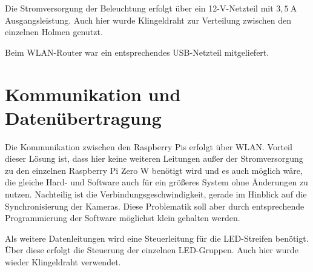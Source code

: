 \documentclass[./00PhotoBox.tex]{subfiles}
\begin{document}
Die Stromversorgung der Beleuchtung erfolgt über ein 12-V-Netzteil mit $3,5~\text{A}$ Ausgangsleistung. Auch hier wurde Klingeldraht zur Verteilung zwischen den einzelnen Holmen genutzt.

Beim WLAN-Router war ein entsprechendes USB-Netzteil mitgeliefert.

\section{Kommunikation und Datenübertragung}
Die Kommunikation zwischen den Raspberry Pis erfolgt über WLAN. Vorteil dieser Lösung ist, dass hier keine weiteren Leitungen außer der Stromversorgung zu den einzelnen Raspberry Pi Zero W benötigt wird und es auch möglich wäre, die gleiche Hard- und Software auch für ein größeres System ohne Änderungen zu nutzen. Nachteilig ist die Verbindungsgeschwindigkeit, gerade im Hinblick auf die Synchronisierung der Kameras. Diese Problematik soll aber durch entsprechende Programmierung der Software möglichst klein gehalten werden.

Als weitere Datenleitungen wird eine Steuerleitung für die LED-Streifen benötigt. Über diese erfolgt die Steuerung der einzelnen LED-Gruppen. Auch hier wurde wieder Klingeldraht verwendet.

\biblio
\end{document}

